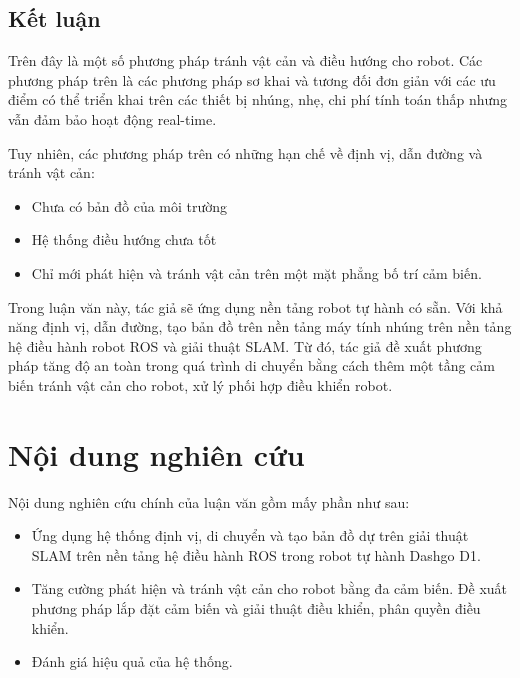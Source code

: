 \subsection*{Kết luận}
Trên đây là một số phương pháp tránh vật cản và điều hướng cho robot. Các phương pháp trên là các phương pháp sơ khai và tương đối đơn giản với các ưu điểm có thể triển khai trên các thiết bị nhúng, nhẹ, chi phí tính toán thấp nhưng vẫn đảm bảo hoạt động real-time.

Tuy nhiên, các phương pháp trên có những hạn chế về định vị, dẫn đường và tránh vật cản:
\begin{itemize}
  \item Chưa có bản đồ của môi trường
  \item Hệ thống điều hướng chưa tốt
  \item Chỉ mới phát hiện và tránh vật cản trên một mặt phẳng bố trí cảm biến.
\end{itemize}

Trong luận văn này, tác giả sẽ ứng dụng nền tảng robot tự hành có sẵn. Với khả năng định vị, dẫn đường, tạo bản đồ trên nền tảng máy tính nhúng trên nền tảng hệ điều hành robot ROS và giải thuật SLAM. Từ đó, tác giả đề xuất phương pháp tăng độ an toàn trong quá trình di chuyển bằng cách thêm một tầng cảm biến tránh vật cản cho robot, xử lý phối hợp điều khiển robot.

\section{Nội dung nghiên cứu}
Nội dung nghiên cứu chính của luận văn gồm mấy phần như sau:

\begin{itemize}
  \item Ứng dụng hệ thống định vị, di chuyển và tạo bản đồ dự trên giải thuật SLAM trên nền tảng hệ điều hành ROS trong robot tự hành Dashgo D1.
  \item Tăng cường phát hiện và tránh vật cản cho robot bằng đa cảm biến. Đề xuất phương pháp lắp đặt cảm biến và giải thuật điều khiển, phân quyền điều khiển.
  \item Đánh giá hiệu quả của hệ thống.
\end{itemize}


